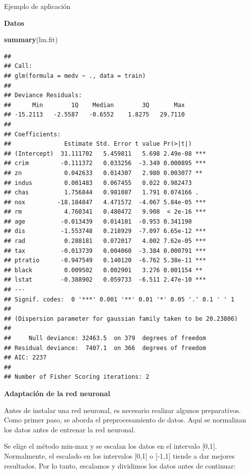 \documentclass[
  ignorenonframetext,
]{beamer}
\newenvironment{Shaded}{\begin{snugshade}}{\end{snugshade}}
\newcommand{\KeywordTok}[1]{\textcolor[rgb]{0.13,0.29,0.53}{\textbf{#1}}}
\newcommand{\NormalTok}[1]{#1}
\begin{document}
\begin{frame}[fragile]{Ejemplo de aplicación}
\begin{block}{\textbf{Datos}}
\end{block}

\begin{block}{}

\begin{Shaded}
\begin{Highlighting}[]
\KeywordTok{summary}\NormalTok{(lm.fit)}
\end{Highlighting}
\end{Shaded}

\begin{verbatim}
## 
## Call:
## glm(formula = medv ~ ., data = train)
## 
## Deviance Residuals: 
##      Min        1Q    Median        3Q       Max  
## -15.2113   -2.5587   -0.6552    1.8275   29.7110  
## 
## Coefficients:
##               Estimate Std. Error t value Pr(>|t|)    
## (Intercept)  31.111702   5.459811   5.698 2.49e-08 ***
## crim         -0.111372   0.033256  -3.349 0.000895 ***
## zn            0.042633   0.014307   2.980 0.003077 ** 
## indus         0.001483   0.067455   0.022 0.982473    
## chas          1.756844   0.981087   1.791 0.074166 .  
## nox         -18.184847   4.471572  -4.067 5.84e-05 ***
## rm            4.760341   0.480472   9.908  < 2e-16 ***
## age          -0.013439   0.014101  -0.953 0.341190    
## dis          -1.553748   0.218929  -7.097 6.65e-12 ***
## rad           0.288181   0.072017   4.002 7.62e-05 ***
## tax          -0.013739   0.004060  -3.384 0.000791 ***
## ptratio      -0.947549   0.140120  -6.762 5.38e-11 ***
## black         0.009502   0.002901   3.276 0.001154 ** 
## lstat        -0.388902   0.059733  -6.511 2.47e-10 ***
## ---
## Signif. codes:  0 '***' 0.001 '**' 0.01 '*' 0.05 '.' 0.1 ' ' 1
## 
## (Dispersion parameter for gaussian family taken to be 20.23806)
## 
##     Null deviance: 32463.5  on 379  degrees of freedom
## Residual deviance:  7407.1  on 366  degrees of freedom
## AIC: 2237
## 
## Number of Fisher Scoring iterations: 2
\end{verbatim}

\end{block}

\begin{block}{\textbf{Adaptación de la red neuronal}}

Antes de instalar una red neuronal, es necesario realizar algunos
preparativos. Como primer paso, se aborda el preprocesamiento de datos.
Aquí se normalizan los datos antes de entrenar la red neuronal.

Se elige el método min-max y se escalan los datos en el intervalo
{[}0,1{]}. Normalmente, el escalado en los intervalos {[}0,1{]} o
{[}-1,1{]} tiende a dar mejores resultados. Por lo tanto, escalamos y
dividimos los datos antes de continuar:


\end{block}
\end{frame}
\end{document}
